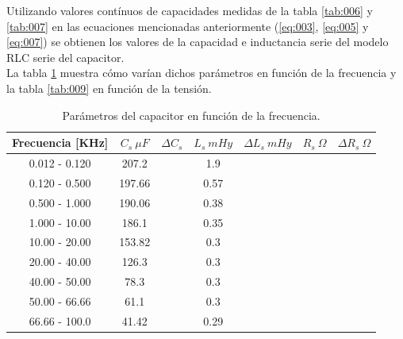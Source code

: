 \documentclass[a4paper,10pt]{article}
\begin{document}
		\indent Utilizando valores contínuos de capacidades medidas de la tabla
		\ref{tab:006} y \ref{tab:007} en las ecuaciones mencionadas anteriormente
		(\ref{eq:003}, \ref{eq:005} y \ref{eq:007}) se obtienen los valores de
		la capacidad e inductancia serie del modelo RLC serie del capacitor. \\
		\indent La tabla \ref{tab:008} muestra cómo varían dichos parámetros en 
		función de la frecuencia y la tabla \ref{tab:009} en función de la 
		tensión.
		
		\begin{table}[!htp]
			\centering
			\begin{tabular}{|c|c|c|c|c|c|c|}
				\hline
				Frecuencia [KHz] & $C_s~\mu F$ & $\Delta C_s$ & 
				$L_s~mHy$  & $\Delta L_s~mHy$  & $R_s~\Omega$ & 
				$\Delta R_s~\Omega$ \\
				\hline
				0.012 - 0.120 &	207.2 &  & 1.9 & \\
				\hline
				0.120 - 0.500 &	197.66 &   & 0.57 & \\
				\hline
				0.500 - 1.000 &	190.06 &   & 0.38 & \\
				\hline
				1.000 - 10.00 &	186.1 &   &	0.35 & \\
				\hline
				10.00 - 20.00 &	153.82 &   & 0.3 & \\
				\hline
				20.00 - 40.00 &	126.3 &   &	0.3 & \\   
				\hline
				40.00 - 50.00 &	78.3 &   & 0.3 & \\
				\hline
				50.00 - 66.66 &	61.1 &   & 0.3 & \\
				\hline
				66.66 - 100.0 &	41.42 &   &	0.29 & \\
				\hline	  
			\end{tabular}
			\caption{Parámetros del capacitor en función de la frecuencia.} 
			\label{tab:008}
		\end{table}	
\end{document}
